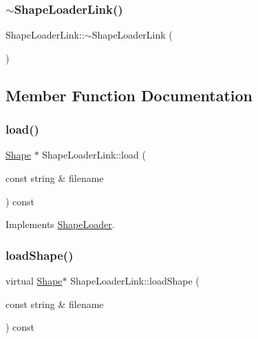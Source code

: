 \hypertarget{class_shape_loader_link_ac1d209f646bb69bae5ba34d7ae132ba1}{}\label{class_shape_loader_link_ac1d209f646bb69bae5ba34d7ae132ba1} 
\subsubsection{\texorpdfstring{$\sim$\+Shape\+Loader\+Link()}{~ShapeLoaderLink()}}
{\footnotesize\ttfamily Shape\+Loader\+Link\+::$\sim$\+Shape\+Loader\+Link (\begin{DoxyParamCaption}{ }\end{DoxyParamCaption})\hspace{0.3cm}{\ttfamily [virtual]}}



\subsection{Member Function Documentation}
\hypertarget{class_shape_loader_link_a0637abbe648488e98f4130bd9827bd72}{}\label{class_shape_loader_link_a0637abbe648488e98f4130bd9827bd72} 
\subsubsection{\texorpdfstring{load()}{load()}}
{\footnotesize\ttfamily \hyperlink{class_shape}{Shape} $\ast$ Shape\+Loader\+Link\+::load (\begin{DoxyParamCaption}\item[{const string \&}]{filename }\end{DoxyParamCaption}) const\hspace{0.3cm}{\ttfamily [virtual]}}



Implements \hyperlink{class_shape_loader_af675cfe98578da47d31c54a3ea3748e1}{Shape\+Loader}.

\hypertarget{class_shape_loader_link_a02f18caa405a1d5a1e24ed5b7bf08320}{}\label{class_shape_loader_link_a02f18caa405a1d5a1e24ed5b7bf08320} 
\subsubsection{\texorpdfstring{load\+Shape()}{loadShape()}}
{\footnotesize\ttfamily virtual \hyperlink{class_shape}{Shape}$\ast$ Shape\+Loader\+Link\+::load\+Shape (\begin{DoxyParamCaption}\item[{const string \&}]{filename }\end{DoxyParamCaption}) const\hspace{0.3cm}{\ttfamily [pure virtual]}}



